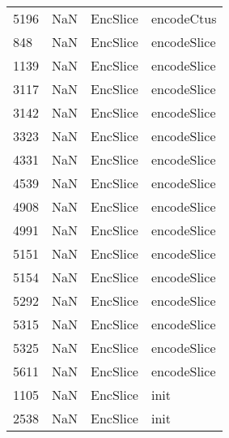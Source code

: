 \begin{tabular}{llll}
5196 &                   NaN &                   EncSlice &                                encodeCtus \\
848  &                   NaN &                   EncSlice &                               encodeSlice \\
1139 &                   NaN &                   EncSlice &                               encodeSlice \\
3117 &                   NaN &                   EncSlice &                               encodeSlice \\
3142 &                   NaN &                   EncSlice &                               encodeSlice \\
3323 &                   NaN &                   EncSlice &                               encodeSlice \\
4331 &                   NaN &                   EncSlice &                               encodeSlice \\
4539 &                   NaN &                   EncSlice &                               encodeSlice \\
4908 &                   NaN &                   EncSlice &                               encodeSlice \\
4991 &                   NaN &                   EncSlice &                               encodeSlice \\
5151 &                   NaN &                   EncSlice &                               encodeSlice \\
5154 &                   NaN &                   EncSlice &                               encodeSlice \\
5292 &                   NaN &                   EncSlice &                               encodeSlice \\
5315 &                   NaN &                   EncSlice &                               encodeSlice \\
5325 &                   NaN &                   EncSlice &                               encodeSlice \\
5611 &                   NaN &                   EncSlice &                               encodeSlice \\
1105 &                   NaN &                   EncSlice &                                      init \\
2538 &                   NaN &                   EncSlice &                                      init \\

\end{tabular}
